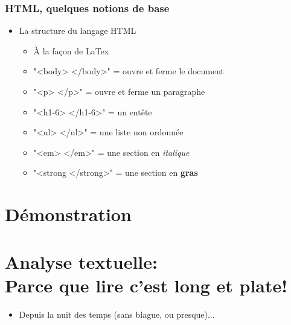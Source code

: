\documentclass{beamer}
\begin{document}
      \begin{frame}
        \frametitle{HTML, quelques notions de base}
          \begin{itemize}
            \item<2-> La structure du langage HTML
              \begin{itemize}
                \item À la façon de LaTex
                \item "<body> </body>" = ouvre et ferme le document
                \item "<p> </p>" = ouvre et ferme un paragraphe
                \item "<h1-6> </h1-6>" = un entête
                \item "<ul> </ul>" =  une liste non ordonnée 
                \item "<em> </em>" = une section en \textit{italique}
                \item "<strong </strong>" = une section en \textbf{gras}
              \end{itemize}
            \end{itemize}
      \end{frame}
     \section{Démonstration}
     
     

 \section{Analyse textuelle: \\
       Parce que lire c'est long et plate!}
     

 \begin{frame}
      
      \begin{itemize}
       
         \frametitle{Une analyse quantitative des textes? Bro, on est en sciences sociales...} \vspace{1cm}
       
            \item Depuis la nuit des temps (sans blague, ou presque)...
            
       
         \end{itemize}
       
  \end{frame}
\end{document}

